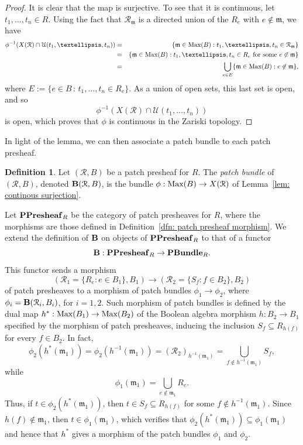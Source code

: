 \documentclass[11pt]{amsart}
\def\m{{\mathfrak m}} %
\theoremstyle{definition}
\newtheorem{definition}[theorem]{Definition}
\def\Max{\mbox{\rm Max}}
\def\cal{\mathcal}
\begin{document}
\begin{proof} It is clear that the map is surjective. To see that it is continuous,
let $t_1,\ldots,t_n \in R$. Using the fact that ${\mathcal{R}}_{\m}$ is a directed union of the $R_e$ with $e \not \in \m$, we have 
\begin{eqnarray*}
\phi^{-1}(X({\cal R}) \cap {\cal U}(t_1,\ldots,t_n) ) & = & 
\{\m \in \Max(B):t_1,\ldots,t_n \in {\cal R}_{\m}\} \\
& = & 
\{\m \in \Max(B):t_1,\ldots,t_n \in R_e {\mbox{ for some }} e \not \in \m\} \\
& = & 
\bigcup_{e\in E} 
\{\m \in \Max(B): e \not \in \m\},
\end{eqnarray*}
where $E:=\{e\in B \, \colon \,  t_1,\dots, t_n\in R_e\}$. As a union of open sets, this last set is open, and so $$\phi^{-1}(X({\cal R}) \cap {\cal U}(t_1,\ldots,t_n))$$ is open, which proves that $\phi$ is continuous in the Zariski topology.  
\end{proof}

In light of the lemma, we can then associate a patch bundle to each patch presheaf. 

\begin{definition}\label{dfn: patch bundle of a presheaf}
Let $({\cal R},B)$ be a patch presheaf for  $R$.  The {\it patch bundle} of  $({\cal R},B)$, denoted ${\bf B}({\cal R},B)$,  is the bundle $\phi:\Max(B) \rightarrow X({\cal R})$ of Lemma~\ref{lem: continous surjection}.  
\end{definition}



Let ${\bf PPresheaf}_R$ be the category of patch presheaves for $R$, where the morphisms are those defined in Definition~\ref{dfn: patch presheaf morphism}. 
We extend the definition of ${\bf B}$ on objects of ${\bf PPresheaf}_R$ to that of a functor
$${\bf B}:{\bf PPresheaf}_R \rightarrow {\bf PBundle}_R.$$  This functor sends a morphism $$({\cal R}_1=\{R_e : e\in B_1\},B_1) \rightarrow ({\cal R}_2=\{S_f : f\in B_2\},B_2)$$ of patch presheaves to a morphism of patch bundles $\phi_1\to \phi_2$, where $\phi_i={\bf B}({\cal R}_i,B_i)$, for $i=1,2$. Such morphism of patch bundles is defined by the dual map $h^*: \Max(B_1) \rightarrow \Max(B_2)$ of the Boolean algebra morphism $h: B_2 \to B_1$ specified by the morphism of patch presheaves, inducing the inclusion $S_f\subseteq R_{h(f)}$ for every $f\in B_2$. 
In fact, \[\phi_2(h^*(\m_1))=\phi_2(h^{-1}(\m_1))=(\cal{R}_2)_{h^{-1}(\m_1)}=\bigcup_{f\not \in h^{-1}(\m_1)}S_f,\] while \[\phi_1(\m_1)=\bigcup_{e\not \in \m_1}R_e.\] Thus, if $t\in \phi_2(h^*(\m_1))$, then $t\in S_f\subseteq R_{h(f)}$ for some $f\not\in h^{-1}(\m_1)$. Since $h(f)\not \in \m_1$, then $t\in \phi_1(\m_1)$, which verifies that $\phi_2(h^*(\m_1)) \subseteq \phi_1(\m_1)$ and hence that $h^*$ gives a morphism of the patch bundles $\phi_1$ and $\phi_2$.
\end{document}
